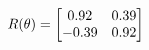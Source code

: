 \documentclass[preview]{standalone}
\begin{document}
\begin{align*}
\special{dvisvgm:raw <g id='unique000'>}R(\theta) = \begin{bmatrix}0.92 & 0.39\\-0.39 & 0.92\end{bmatrix}\special{dvisvgm:raw </g>}
\end{align*}
\end{document}
